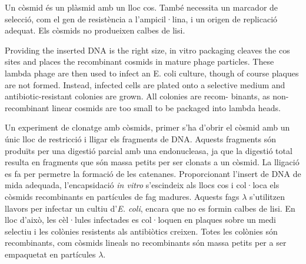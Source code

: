 Un còsmid és un plàsmid amb un lloc cos. També necessita un marcador
de selecció, com el gen de resistència a l'ampicil·lina, i un origen
de replicació adequat. Els còsmids no produeixen calbes de lisi. 

Providing the inserted DNA is the right size, in vitro
packaging cleaves the cos sites and places the recombinant cosmids in
mature phage particles. These lambda phage are then used to infect an
E. coli culture, though of course plaques are not formed. Instead,
infected cells are plated onto a selective medium and
antibiotic-resistant colonies are grown. All colonies are recom-
binants, as non-recombinant linear cosmids are too small to be
packaged into lambda heads.

Un experiment de clonatge amb còsmids, primer s'ha d'obrir el còsmid
amb un únic lloc de restricció i lligar els fragments de DNA. Aquests
fragments són produïts per una digestió parcial amb una endonucleasa,
ja que la digestió total resulta en fragments que són massa petits per
ser clonats a un còsmid. La lligació es fa per permetre la formació de
les catenanes. Proporcionant l'insert de DNA de mida adequada,
l'encapsidació \textit{in vitro} s'escindeix als llocs cos i col·loca
els còsmids recombinants en partícules de fag madures. Aquests fags
$\lambda$ s'utilitzen llavors per infectar un cultiu
d'\textit{E. coli}, encara que no es formin calbes de lisi. En lloc
d'això, les cèl·lules infectades es col·loquen en plaques sobre un
medi selectiu i les colònies resistents als antibiòtics creixen. Totes les colònies
són recombinants, com còsmids lineals no recombinants són massa petits
per a ser empaquetat en partícules $\lambda$.